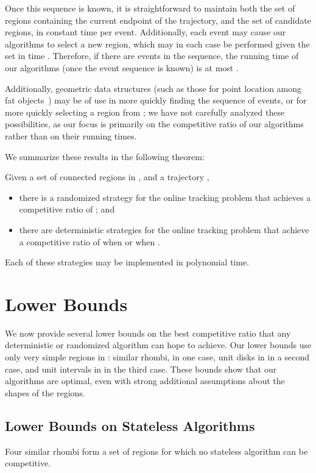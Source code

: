 \documentclass[runningheads]{llncs}
\begin{document}
Once this sequence is known, it is straightforward to maintain both the set of regions containing the current endpoint of the trajectory, and the set  of candidate regions, in constant time per event. Additionally, each event may cause our algorithms to select a new region, which may in each case be performed given the set  in time . Therefore, if there are  events in the sequence, the running time of our algorithms (once the event sequence is known) is at most .

Additionally, geometric data structures (such as those for point location among fat objects~\cite {os-rsplfo-96}) may be of use in more quickly  finding the sequence of events, or for more quickly selecting a region from ; we have not carefully analyzed these possibilities, as our focus is primarily on the competitive ratio of our algorithms rather than on their running times.

We summarize these results in the following theorem:

      \begin {theorem}
        Given a set  of  connected regions in , and a trajectory ,
        \begin {itemize}
          \item there is a randomized strategy for the online tracking problem that achieves a competitive ratio of ; and
          \item there are deterministic strategies for  the online tracking problem that achieve a competitive ratio of  when  or  when .
        \end {itemize}
        Each of these strategies may be implemented in polynomial time.
      \end {theorem}
      

\section {Lower Bounds} \label {sec:lowerbounds}
  
We now provide several lower bounds on the best competitive ratio that any deterministic or randomized algorithm can hope to achieve. Our lower bounds use only very simple regions in : similar rhombi, in one case, unit disks in  in a second case, and unit intervals in  in the third case. These bounds show that our algorithms are optimal, even with strong additional assumptions about the shapes of the regions.

\subsection{Lower Bounds on Stateless Algorithms}
 {Four similar rhombi form a set of regions for which no stateless algorithm can be competitive.}
\end{document}
